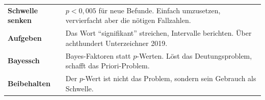 \begin{merksatz}
\begin{center}
{\small
\renewcommand{\arraystretch}{1.52}
\begin{tabular}{@{}P{2.4cm}P{6.2cm}@{}}
\toprule
\textbf{Schwelle senken} & $p < 0{,}005$ für neue Befunde. Einfach umzusetzen, vervierfacht aber die nötigen Fallzahlen.\\
\textbf{Aufgeben} & Das Wort \enquote{signifikant} streichen, Intervalle berichten. Über achthundert Unterzeichner 2019.\\
\textbf{Bayessch} & Bayes-Faktoren statt $p$-Werten. Löst das Deutungsproblem, schafft das Priori-Problem.\\
\textbf{Beibehalten} & Der $p$-Wert ist nicht das Problem, sondern sein Gebrauch als Schwelle.\\
\bottomrule
\end{tabular}}
\end{center}

\begin{center}
\begin{minipage}{0.88\textwidth}
\end{minipage}
\end{center}
\end{merksatz}

